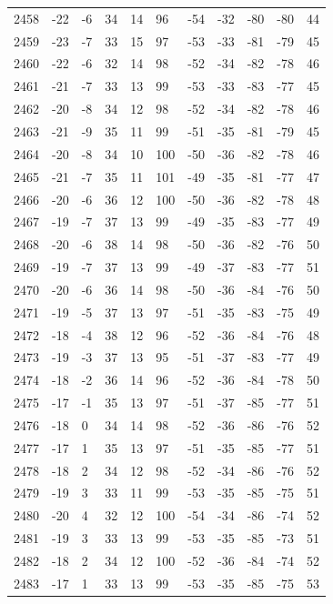\begin{table}[H]
\begin{tabular}{lllllllllll}
2458 & -22 & -6 & 34 & 14 & 96 & -54 & -32 & -80 & -80 & 44 \\
2459 & -23 & -7 & 33 & 15 & 97 & -53 & -33 & -81 & -79 & 45 \\
2460 & -22 & -6 & 32 & 14 & 98 & -52 & -34 & -82 & -78 & 46 \\
2461 & -21 & -7 & 33 & 13 & 99 & -53 & -33 & -83 & -77 & 45 \\
2462 & -20 & -8 & 34 & 12 & 98 & -52 & -34 & -82 & -78 & 46 \\
2463 & -21 & -9 & 35 & 11 & 99 & -51 & -35 & -81 & -79 & 45 \\
2464 & -20 & -8 & 34 & 10 & 100 & -50 & -36 & -82 & -78 & 46 \\
2465 & -21 & -7 & 35 & 11 & 101 & -49 & -35 & -81 & -77 & 47 \\
2466 & -20 & -6 & 36 & 12 & 100 & -50 & -36 & -82 & -78 & 48 \\
2467 & -19 & -7 & 37 & 13 & 99 & -49 & -35 & -83 & -77 & 49 \\
2468 & -20 & -6 & 38 & 14 & 98 & -50 & -36 & -82 & -76 & 50 \\
2469 & -19 & -7 & 37 & 13 & 99 & -49 & -37 & -83 & -77 & 51 \\
2470 & -20 & -6 & 36 & 14 & 98 & -50 & -36 & -84 & -76 & 50 \\
2471 & -19 & -5 & 37 & 13 & 97 & -51 & -35 & -83 & -75 & 49 \\
2472 & -18 & -4 & 38 & 12 & 96 & -52 & -36 & -84 & -76 & 48 \\
2473 & -19 & -3 & 37 & 13 & 95 & -51 & -37 & -83 & -77 & 49 \\
2474 & -18 & -2 & 36 & 14 & 96 & -52 & -36 & -84 & -78 & 50 \\
2475 & -17 & -1 & 35 & 13 & 97 & -51 & -37 & -85 & -77 & 51 \\
2476 & -18 & 0 & 34 & 14 & 98 & -52 & -36 & -86 & -76 & 52 \\
2477 & -17 & 1 & 35 & 13 & 97 & -51 & -35 & -85 & -77 & 51 \\
2478 & -18 & 2 & 34 & 12 & 98 & -52 & -34 & -86 & -76 & 52 \\
2479 & -19 & 3 & 33 & 11 & 99 & -53 & -35 & -85 & -75 & 51 \\
2480 & -20 & 4 & 32 & 12 & 100 & -54 & -34 & -86 & -74 & 52 \\
2481 & -19 & 3 & 33 & 13 & 99 & -53 & -35 & -85 & -73 & 51 \\
2482 & -18 & 2 & 34 & 12 & 100 & -52 & -36 & -84 & -74 & 52 \\
2483 & -17 & 1 & 33 & 13 & 99 & -53 & -35 & -85 & -75 & 53 \\

\end{tabular}
\end{table}
